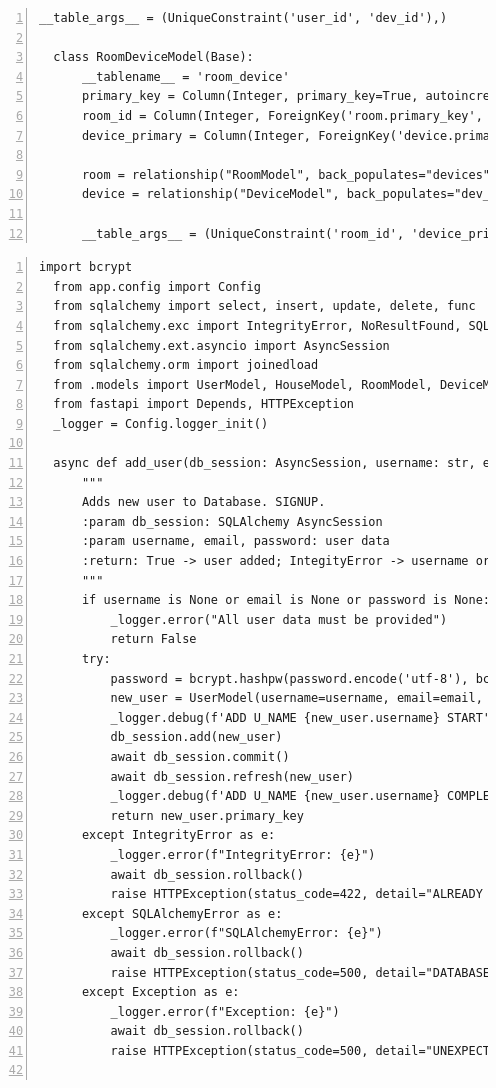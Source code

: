 \documentclass[12pt, letterpaper]{article}
\begin{document}
\begin{lstlisting}[frame=single, style=py, numbers=left, label={lst:dbmodels}, caption={db: models.py}]
      __table_args__ = (UniqueConstraint('user_id', 'dev_id'),)
  
  class RoomDeviceModel(Base):
      __tablename__ = 'room_device'
      primary_key = Column(Integer, primary_key=True, autoincrement=True, nullable=False)
      room_id = Column(Integer, ForeignKey('room.primary_key', ondelete='CASCADE'), nullable=False)
      device_primary = Column(Integer, ForeignKey('device.primary_key', ondelete='CASCADE'), nullable=False)
  
      room = relationship("RoomModel", back_populates="devices")
      device = relationship("DeviceModel", back_populates="dev_rooms")
  
      __table_args__ = (UniqueConstraint('room_id', 'device_primary'),)
    \end{lstlisting}
\begin{lstlisting}[frame=single, style=py, numbers=left, label={lst:dbqueries}, caption={db: queries.py}]
  import bcrypt
  from app.config import Config
  from sqlalchemy import select, insert, update, delete, func
  from sqlalchemy.exc import IntegrityError, NoResultFound, SQLAlchemyError
  from sqlalchemy.ext.asyncio import AsyncSession
  from sqlalchemy.orm import joinedload
  from .models import UserModel, HouseModel, RoomModel, DeviceModel, RoomDeviceModel
  from fastapi import Depends, HTTPException
  _logger = Config.logger_init()
  
  async def add_user(db_session: AsyncSession, username: str, email: str, password: str):
      """
      Adds new user to Database. SIGNUP.
      :param db_session: SQLAlchemy AsyncSession
      :param username, email, password: user data
      :return: True -> user added; IntegityError -> username or email already in DB; HTTPExcepion
      """
      if username is None or email is None or password is None:
          _logger.error("All user data must be provided")
          return False
      try:
          password = bcrypt.hashpw(password.encode('utf-8'), bcrypt.gensalt())
          new_user = UserModel(username=username, email=email, password=password)
          _logger.debug(f'ADD U_NAME {new_user.username} START')
          db_session.add(new_user)
          await db_session.commit()
          await db_session.refresh(new_user)
          _logger.debug(f'ADD U_NAME {new_user.username} COMPLETED')
          return new_user.primary_key
      except IntegrityError as e:
          _logger.error(f"IntegrityError: {e}")
          await db_session.rollback()
          raise HTTPException(status_code=422, detail="ALREADY EXISTS")
      except SQLAlchemyError as e:
          _logger.error(f"SQLAlchemyError: {e}")
          await db_session.rollback()
          raise HTTPException(status_code=500, detail="DATABASE ERROR")
      except Exception as e:
          _logger.error(f"Exception: {e}")
          await db_session.rollback()
          raise HTTPException(status_code=500, detail="UNEXPECTED DATABASE ERROR")
  

\end{lstlisting}
\end{document}
